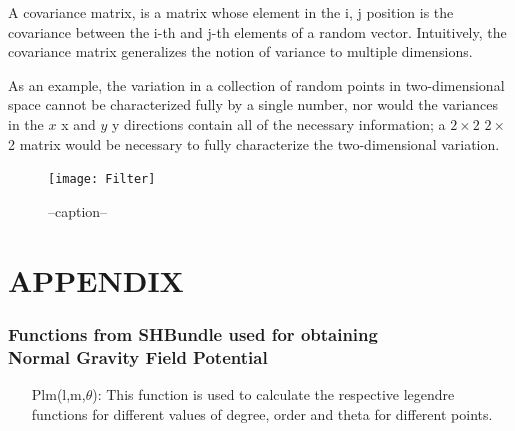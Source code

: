\documentclass[a4paper,12pt]{report}
\begin{document}
 A covariance matrix, is a matrix whose element in the i, j position is the covariance between the i-th and j-th elements of a random vector.
 Intuitively, the covariance matrix generalizes the notion of variance to multiple dimensions.
 
 As an example, the variation in a collection of random points in two-dimensional space cannot be characterized fully by a single number, nor would the variances in the ${\displaystyle x}$ x and $ {\displaystyle y}$ y directions contain all of the necessary information; a ${\displaystyle 2\times 2}$ $ 2\times$ 2 matrix would be necessary to fully characterize the two-dimensional variation.

\begin{figure}[!h]
	\advance\leftskip-2cm
    \texttt{[image: Filter]}
    \caption{--caption--}
\end{figure}

\chapter{APPENDIX}

\subsection{Functions from SHBundle used for obtaining \\Normal Gravity Field Potential}
\begin{itemize}
	\item[Plm(l,m,$\theta$): ] This function is used to calculate the respective legendre functions for different values of degree, order and theta for different points.
\end{itemize}
\end{document}
